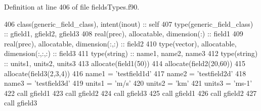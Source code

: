 Definition at line 406 of file fields\+Types.\+f90.


\begin{DoxyCode}
406     \textcolor{keywordtype}{class}(generic\_field\_class), \textcolor{keywordtype}{intent(inout)} :: self
407     \textcolor{keywordtype}{type}(generic\_field\_class) :: gfield1, gfield2, gfield3
408     \textcolor{keywordtype}{real(prec)}, \textcolor{keywordtype}{allocatable}, \textcolor{keywordtype}{dimension(:)} :: field1
409     \textcolor{keywordtype}{real(prec)}, \textcolor{keywordtype}{allocatable}, \textcolor{keywordtype}{dimension(:,:)} :: field2
410     \textcolor{keywordtype}{type}(vector), \textcolor{keywordtype}{allocatable}, \textcolor{keywordtype}{dimension(:,:,:)} :: field3
411     \textcolor{keywordtype}{type}(string) :: name1, name2, name3
412     \textcolor{keywordtype}{type}(string) :: units1, units2, units3
413     \textcolor{keyword}{allocate}(field1(50))
414     \textcolor{keyword}{allocate}(field2(20,60))
415     \textcolor{keyword}{allocate}(field3(2,3,4))
416     name1 = \textcolor{stringliteral}{'testfield1d'}
417     name2 = \textcolor{stringliteral}{'testfield2d'}
418     name3 = \textcolor{stringliteral}{'testfield3d'}
419     units1 = \textcolor{stringliteral}{'m/s'}
420     units2 = \textcolor{stringliteral}{'km'}
421     units3 = \textcolor{stringliteral}{'ms-1'}
422     \textcolor{keyword}{call }gfield1%
423     \textcolor{keyword}{call }gfield2%
424     \textcolor{keyword}{call }gfield3%
425     \textcolor{keyword}{call }gfield1%
426     \textcolor{keyword}{call }gfield2%
427     \textcolor{keyword}{call }gfield3%
\end{DoxyCode}
